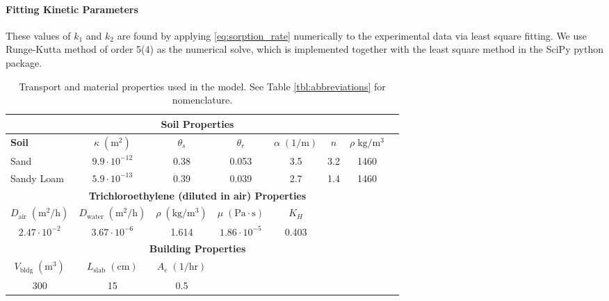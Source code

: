 \paragraph{Fitting Kinetic Parameters}

These values of $k_1$ and $k_2$ are found by applying \eqref{eq:sorption_rate} numerically to the experimental data via least square fitting.
We use Runge-Kutta method of order 5(4) as the numerical solve, which is implemented together with the least square method in the SciPy python package\cite{jones_scipy_2011}.


\begin{table}[htb!]
  \setlength{\tabcolsep}{1pt}
  \centering
  \begin{tabular}{l c c c c c c c}
    \toprule
    \multicolumn{7}{c}{\textbf{Soil Properties}\cite{abreu_conceptual_2012,u.s._environmental_protection_agency_userss_2004}} \\
    \midrule
    \textbf{Soil} & \textbf{$\kappa \; \mathrm{(m^2)}$} & \textbf{$\theta_s$} & \textbf{$\theta_r$} & \textbf{$\alpha \; \mathrm{(1/m)}$} & \textbf{$n$} & \textbf{$\rho \; \mathrm{kg/m^3}$} \\
    Sand & $9.9 \cdot 10^{-12}$ & 0.38 & 0.053 & 3.5 & 3.2 & 1460 \\
    Sandy Loam & $5.9 \cdot 10^{-13}$ & 0.39 & 0.039 & 2.7 & 1.4 & 1460 \\
    \midrule
    \multicolumn{7}{c}{\textbf{Trichloroethylene (diluted in air) Properties}\cite{abreu_conceptual_2012,u.s._environmental_protection_agency_userss_2004}} \\
    \midrule
    \multicolumn{1}{c}{\textbf{$D_\mathrm{air} \; \mathrm{(m^2/h)}$}} & \textbf{$D_\mathrm{water} \; \mathrm{(m^2/h)}$} & \textbf{$\rho \; \mathrm{(kg/m^3)}$} & \textbf{$\mu \; \mathrm{(Pa \cdot s)}$} & \textbf{$K_H$} \\
    \multicolumn{1}{c}{$2.47 \cdot 10^{-2}$} & $3.67 \cdot 10^{-6}$ & 1.614 & $1.86 \cdot 10^{-5}$ & 0.403 \\
    \midrule
    \multicolumn{7}{c}{\textbf{Building Properties}} \\
    \midrule
    \multicolumn{1}{c}{\textbf{$V_\mathrm{bldg} \; \mathrm{(m^3)}$}} & \textbf{$L_\mathrm{slab} \; \mathrm{(cm)}$} & \textbf{$A_e \; \mathrm{(1/hr)}$} \\
    \multicolumn{1}{c}{300} & 15 & 0.5 \\
    \bottomrule
  \end{tabular}
  \caption{Transport and material properties used in the model. See Table \ref{tbl:abbreviations} for nomenclature.}\label{tbl:model}
\end{table}
